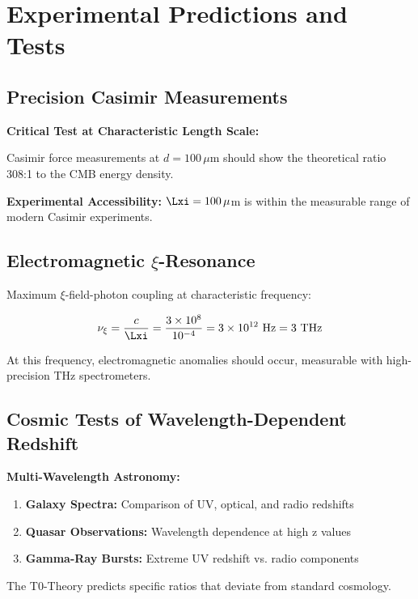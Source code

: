 	\section{Experimental Predictions and Tests}
	
	\subsection{Precision Casimir Measurements}
	
	\begin{experiment}
		\textbf{Critical Test at Characteristic Length Scale:}
		
		Casimir force measurements at $d = 100\,\mu$m should show the theoretical ratio 308:1 to the CMB energy density.
		
		\textbf{Experimental Accessibility:} $\Lxi = 100\,\mu$m is within the measurable range of modern Casimir experiments.
	\end{experiment}
	
	\subsection{Electromagnetic $\xi$-Resonance}
	
	Maximum $\xi$-field-photon coupling at characteristic frequency:
	
	\begin{equation}
		\nu_\xi = \frac{c}{\Lxi} = \frac{3 \times 10^8}{10^{-4}} = 3 \times 10^{12} \text{ Hz} = 3 \text{ THz}
	\end{equation}
	
	At this frequency, electromagnetic anomalies should occur, measurable with high-precision THz spectrometers.
	
	\subsection{Cosmic Tests of Wavelength-Dependent Redshift}
	
	\begin{experiment}
		\textbf{Multi-Wavelength Astronomy:}
		
		\begin{enumerate}
			\item \textbf{Galaxy Spectra:} Comparison of UV, optical, and radio redshifts
			\item \textbf{Quasar Observations:} Wavelength dependence at high z values
			\item \textbf{Gamma-Ray Bursts:} Extreme UV redshift vs. radio components
		\end{enumerate}
		
		The T0-Theory predicts specific ratios that deviate from standard cosmology.
	\end{experiment}
	
